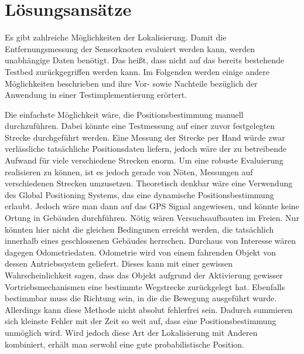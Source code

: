 \section{Lösungsansätze}
\label{sec:loesungsansaetze}

Es gibt zahlreiche Möglichkeiten der Lokalisierung. Damit die Entfernungsmessung der Sensorknoten evaluiert werden kann, werden unabhängige Daten benötigt. {\color{red}Das heißt, dass nicht auf das bereits bestehende Testbed zurückgegriffen werden kann.} Im Folgenden werden einige andere Möglichkeiten beschrieben und ihre Vor- sowie Nachteile bezüglich der Anwendung in einer Testimplementierung erörtert. 

Die einfachste Möglichkeit wäre, die Positionsbestimmung manuell durchzuführen. Dabei könnte eine Testmessung auf einer zuvor festgelegten Strecke durchgeführt werden. Eine Messung der Strecke per Hand würde zwar verlässliche tatsächliche Positionsdaten liefern, jedoch wäre der zu betreibende Aufwand für viele verschiedene Strecken enorm.
Um eine robuste Evaluierung realisieren zu können, ist es jedoch gerade von Nöten, Messungen auf verschiedenen Strecken umzusetzen.
Theoretisch denkbar wäre eine Verwendung des Global Positioning Systems, das eine dynamische Positionsbestimmung erlaubt. Jedoch wäre man dann auf das GPS Signal angewiesen, und könnte keine Ortung in Gebäuden durchführen. Nötig wären Versuchsaufbauten im Freien. Nur könnten hier nicht die gleichen Bedingunen erreicht werden, die tatsächlich innerhalb eines geschlossenen Gebäudes herrschen.
Durchaus von Interesse wären dagegen Odometriedaten. Odometrie wird von einem fahrenden Objekt von dessen Antriebssystem geliefert. Dieses kann mit einer gewissen Wahrscheinlichkeit sagen, dass das Objekt aufgrund der Aktivierung gewisser Vortriebsmechanismen eine bestimmte Wegstrecke zurückgelegt hat. Ebenfalls bestimmbar muss die Richtung sein, in die die Bewegung ausgeführt wurde. Allerdings kann diese Methode nicht absolut fehlerfrei sein. Dadurch summieren sich kleinste Fehler mit der Zeit so weit auf, dass eine Positionsbestimmung unmöglich wird.
Wird jedoch diese Art der Lokalisierung mit Anderen kombiniert, erhält man serwohl eine gute probabilistische Position.
